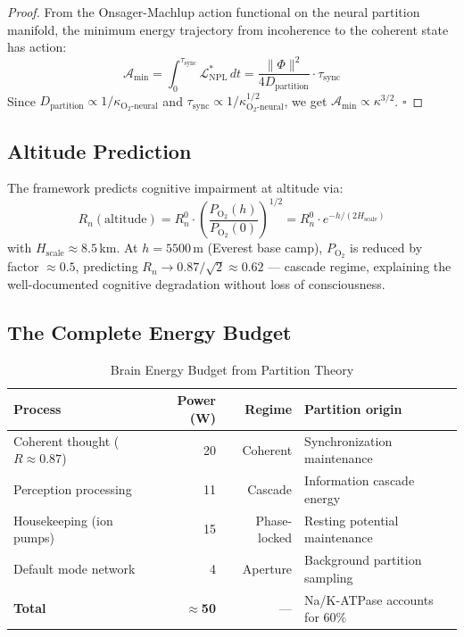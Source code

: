 \documentclass[12pt,a4paper]{article}
\theoremstyle{definition}
\newcommand{\LNPL}{\mathcal{L}_{\text{NPL}}}
\begin{document}
\begin{proof}
From the Onsager-Machlup action functional on the neural partition manifold,
the minimum energy trajectory from incoherence to the coherent state has action:
\begin{equation}
\mathcal{A}_{\min} = \int_0^{\tau_{\text{sync}}} \LNPL^* \, dt
= \frac{\|\Phi\|^2}{4D_{\text{partition}}} \cdot \tau_{\text{sync}}
\end{equation}
Since $D_{\text{partition}} \propto 1/\kappa_{\text{O}_2\text{-neural}}$ and
$\tau_{\text{sync}} \propto 1/\kappa_{\text{O}_2\text{-neural}}^{1/2}$,
we get $\mathcal{A}_{\min} \propto \kappa^{3/2}$. $\square$
\end{proof}

\subsection{Altitude Prediction}

The framework predicts cognitive impairment at altitude via:
\begin{equation}
R_n(\text{altitude}) = R_n^0 \cdot \left(\frac{P_{\text{O}_2}(h)}{P_{\text{O}_2}(0)}\right)^{1/2}
= R_n^0 \cdot e^{-h/(2H_{\text{scale}})}
\end{equation}
with $H_{\text{scale}} \approx 8.5$\,km. At $h = 5500$\,m (Everest base camp),
$P_{\text{O}_2}$ is reduced by factor $\approx 0.5$, predicting $R_n \to 0.87/\sqrt{2} \approx 0.62$
— cascade regime, explaining the well-documented cognitive degradation without
loss of consciousness.

\subsection{The Complete Energy Budget}

\begin{table}[H]
\centering
\caption{Brain Energy Budget from Partition Theory}
\label{tab:energy}
\begin{tabular}{lrrl}
\toprule
\textbf{Process} & \textbf{Power (W)} & \textbf{Regime} & \textbf{Partition origin}\\
\midrule
Coherent thought ($R \approx 0.87$) & 20 & Coherent & Synchronization maintenance\\
Perception processing & 11 & Cascade & Information cascade energy\\
Housekeeping (ion pumps) & 15 & Phase-locked & Resting potential maintenance\\
Default mode network & 4 & Aperture & Background partition sampling\\
\midrule
\textbf{Total} & \textbf{$\approx$50} & — & Na/K-ATPase accounts for 60\%\\
\bottomrule
\end{tabular}
\end{table}
\end{document}
